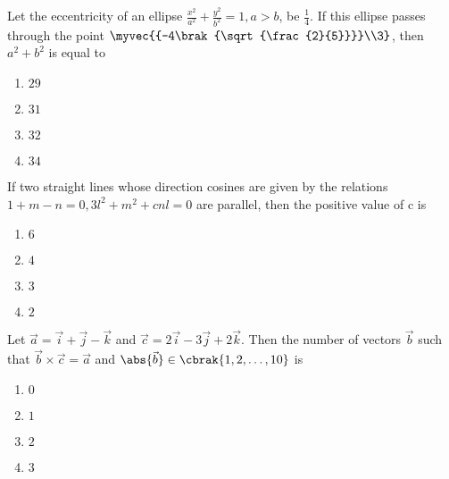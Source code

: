     \item Let the eccentricity of an ellipse $\frac{x^2}{a^2} + \frac{y^2}{b^2} = 1, a > b$, be $\frac{1}{4}$. If this ellipse passes through the point $\myvec{{-4\brak{\sqrt{\frac{2}{5}}}}\\3}$, then $a^2 + b^2$ is equal to
    \hfill{}

	\begin{enumerate}
		\item $29$ 
		\item $31$
		\item $32$
		\item $34$
	\end{enumerate}


    \item If two straight lines whose direction cosines are given by the relations $1 + m - n = 0, 3l^2 + m^2 + cnl = 0$ are parallel, then the positive value of c is
    \hfill{}

	\begin{enumerate}
		\item $6$ 
		\item $4$
		\item $3$
		\item $2$
	\end{enumerate}

    \item Let $\vec{a} = \vec{i} + \vec{j} - \vec{k}$ and $\vec{c} = 2\vec{i} - 3\vec{j} + 2\vec{k}$. Then the number of vectors $\vec{b}$ such that $\vec{b} \times \vec{c} = \vec{a}$ and $\abs{\vec{b}} \in \cbrak{1, 2, \dots, 10}$ is
    \hfill{}

	\begin{enumerate}
		\item $0$ 
		\item $1$
		\item $2$
		\item $3$
	\end{enumerate}